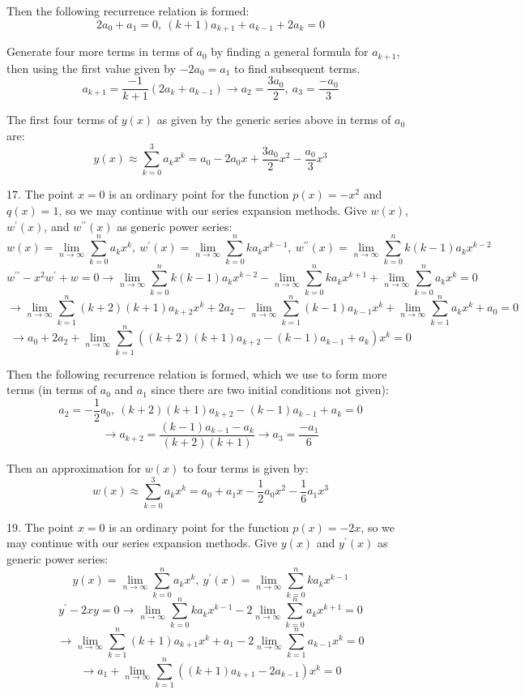 \documentclass[11pt]{article}
\newcommand{\br}[1]{\left(#1\right)}
\newcommand{\dprime}{\prime\prime}
\begin{document}
Then the following recurrence relation is formed:
$$2a_0 + a_1 = 0, ~ \br{k+1}a_{k+1} + a_{k-1} + 2a_k = 0$$

Generate four more terms in terms of $a_0$ by finding a general formula for $a_{k+1}$, then using the first value given by $-2a_0 = a_1$ to find subsequent terms.
$$a_{k+1} = \frac{-1}{k+1}\br{2a_k+a_{k-1}} \to a_2 = \frac{3a_0}{2}, ~a_3 = \frac{-a_0}{3}$$

The first four terms of $y(x)$ as given by the generic series above in terms of $a_0$ are:
$$y(x) \approx \sum_{k=0}^3 a_k x^k = a_0 - 2a_0 x + \frac{3a_0}{2}x^2 - \frac{a_0}{3}x^3$$

17. The point $x=0$ is an ordinary point for the function $p(x) = -x^2$ and $q(x) = 1$, so we may continue with our series expansion methods. Give $w(x)$, $w^{\prime}(x)$, and $w^{\dprime}(x)$ as generic power series:
$$w(x) = \lim_{n\to \infty}\sum_{k=0}^{n} a_k x^k, ~ w^{\prime}(x) = \lim_{n\to \infty}\sum_{k=0}^n ka_kx^{k-1}, ~ w^{\dprime}(x) = \lim_{n\to \infty}\sum_{k=0}^n k(k-1)a_kx^{k-2}$$
$$w^{\dprime} -x^2w^{\prime}+ w = 0 \to \lim_{n\to \infty}\sum_{k=0}^n k(k-1)a_kx^{k-2}  -\lim_{n\to \infty}\sum_{k=0}^n ka_kx^{k+1} + \lim_{n\to \infty}\sum_{k=0}^{n} a_k x^k = 0$$
$$\to \lim_{n\to \infty}\sum_{k=1}^n (k+2)(k+1)a_{k+2}x^{k} + 2a_{2}  -\lim_{n\to \infty}\sum_{k=1}^n (k-1)a_{k-1}x^{k} + \lim_{n\to \infty}\sum_{k=1}^{n} a_k x^k + a_0 = 0$$
$$\to a_0 + 2a_2 + \lim_{n\to \infty}\sum_{k=1}^n\br{(k+2)(k+1)a_{k+2} - (k-1)a_{k-1} + a_k}x^k = 0$$

Then the following recurrence relation is formed, which we use to form more terms (in terms of $a_0$ and $a_1$ since there are two initial conditions not given):
$$a_2 = -\frac{1}{2}a_0,~ (k+2)(k+1)a_{k+2} - (k-1)a_{k-1} + a_k = 0$$
$$\to a_{k+2} = \frac{(k-1)a_{k-1} - a_k}{(k+2)(k+1)} \to  a_3 = \frac{-a_1}{6}$$

Then an approximation for $w(x)$ to four terms is given by:
$$w(x) \approx \sum_{k=0}^3 a_k x^k = a_0 + a_1x -\frac{1}{2}a_0x^2 -\frac{1}{6}a_1x^3$$

19. The point $x=0$ is an ordinary point for the function $p(x) = -2x$, so we may continue with our series expansion methods. Give $y(x)$ and $y^{\prime}(x)$ as generic power series:
$$y(x) = \lim_{n\to \infty}\sum_{k=0}^{n} a_k x^k, ~ y^{\prime}(x) = \lim_{n\to \infty}\sum_{k=0}^n ka_kx^{k-1}$$
$$y^{\prime}-2xy = 0 \to \lim_{n\to \infty}\sum_{k=0}^n ka_kx^{k-1} -2\lim_{n\to \infty}\sum_{k=0}^{n} a_k x^{k+1} = 0$$
$$\to \lim_{n\to \infty}\sum_{k=1}^n (k+1)a_{k+1}x^{k} + a_1 -2\lim_{n\to \infty}\sum_{k=1}^{n} a_{k-1} x^{k} = 0$$
$$\to a_1 + \lim_{n\to \infty}\sum_{k=1}^n \br{(k+1)a_{k+1}-2a_{k-1}}x^k = 0$$
\end{document}
